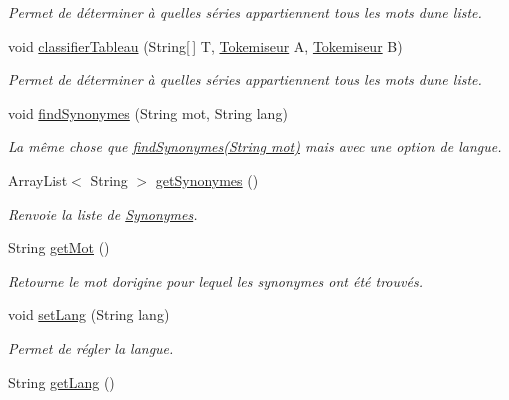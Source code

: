\begin{DoxyCompactItemize}
\begin{DoxyCompactList}\small\item\em Permet de déterminer à quelles séries appartiennent tous les mots d\textquotesingle{}une liste. \end{DoxyCompactList}\item 
void \hyperlink{classsynonymes_1_1_synonymes_a61492947a9ea015936855ec3e5ca815e}{classifier\+Tableau} (String\mbox{[}$\,$\mbox{]} T, \hyperlink{classtokemisation_1_1_tokemiseur}{Tokemiseur} A, \hyperlink{classtokemisation_1_1_tokemiseur}{Tokemiseur} B)
\begin{DoxyCompactList}\small\item\em Permet de déterminer à quelles séries appartiennent tous les mots d\textquotesingle{}une liste. \end{DoxyCompactList}\item 
void \hyperlink{classsynonymes_1_1_synonymes_a9465aad2d2b68eaaf9fe0bbccde9b934}{find\+Synonymes} (String mot, String lang)
\begin{DoxyCompactList}\small\item\em La même chose que \hyperlink{classsynonymes_1_1_synonymes_aa0cc803aca4798d8bb630a1be78b4383}{find\+Synonymes(\+String mot)} mais avec une option de langue. \end{DoxyCompactList}\item 
Array\+List$<$ String $>$ \hyperlink{classsynonymes_1_1_synonymes_aa4defad4e15650af612d56f753912817}{get\+Synonymes} ()
\begin{DoxyCompactList}\small\item\em Renvoie la liste de \hyperlink{classsynonymes_1_1_synonymes}{Synonymes}. \end{DoxyCompactList}\item 
String \hyperlink{classsynonymes_1_1_synonymes_ac3399304ab9193333944a7ef51edd2cf}{get\+Mot} ()
\begin{DoxyCompactList}\small\item\em Retourne le mot d\textquotesingle{}origine pour lequel les synonymes ont été trouvés. \end{DoxyCompactList}\item 
void \hyperlink{classsynonymes_1_1_synonymes_aac6ad3658b8cd4e6b1f38c807b71db42}{set\+Lang} (String lang)
\begin{DoxyCompactList}\small\item\em Permet de régler la langue. \end{DoxyCompactList}\item 
String \hyperlink{classsynonymes_1_1_synonymes_ac361b78facb95f071f726b03a1fa5d57}{get\+Lang} ()

\end{DoxyCompactItemize}
